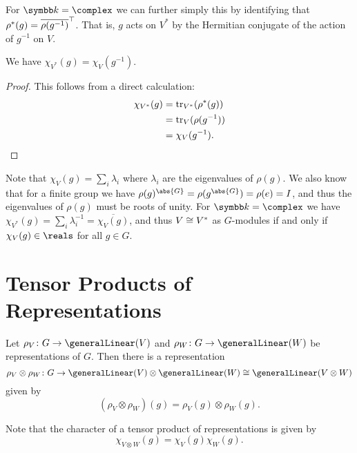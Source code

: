 For \(\field = \complex\) we can further simply this by identifying that \(\rho^*(g) = \overline{\rho(g^{-1})}^{\top}\).
That is, \(g\) acts on \(V^*\) by the Hermitian conjugate of the action of \(g^{-1}\) on \(V\).

\begin{lma}{}{}
    We have \(\chi_{V^*}(g) = \chi_{V}(g^{-1})\).
    \begin{proof}
        This follows from a direct calculation:
        \begin{align}
            \chi_{V^*}(g) &= \operatorname{tr}_{V^*}(\rho^*(g))\\
            &= \operatorname{tr}_{V}(\rho(g^{-1}))\\
            &= \chi_V(g^{-1}). \notag\qedhere
        \end{align}
    \end{proof}
\end{lma}

Note that \(\chi_V(g) = \sum_{i} \lambda_i\) where \(\lambda_i\) are the eigenvalues of \(\rho(g)\).
We also know that for a finite group we have \(\rho(g)^{\abs{G}} = \rho(g^{\abs{G}}) = \rho(e) = I\), and thus the eigenvalues of \(\rho(g)\) must be roots of unity.
For \(\field = \complex\) we have \(\chi_{V^*}(g) = \sum_{i} \lambda_i^{-1} = \overline{\chi_V(g)}\), and thus \(V \cong V^*\) as \(G\)-modules if and only if \(\chi_V(g) \in \reals\) for all \(g \in G\).

\section{Tensor Products of Representations}
\begin{dfn}{}{}
    Let \(\rho_V \colon G \to \generalLinear(V)\) and \(\rho_W \colon G \to \generalLinear(W)\) be representations of \(G\).
    Then there is a representation
    \begin{equation}
        \rho_V \otimes \rho_W \colon G \to \generalLinear(V) \otimes \generalLinear(W) \isomorphic \generalLinear(V \otimes W)
    \end{equation}
    given by
    \begin{equation}
        (\rho_V \otimes \rho_W)(g) = \rho_V(g) \otimes \rho_W(g).
    \end{equation}
\end{dfn}

Note that the character of a tensor product of representations is given by
\begin{equation}
    \chi_{V \otimes W}(g) = \chi_V(g) \chi_W(g).
\end{equation}

